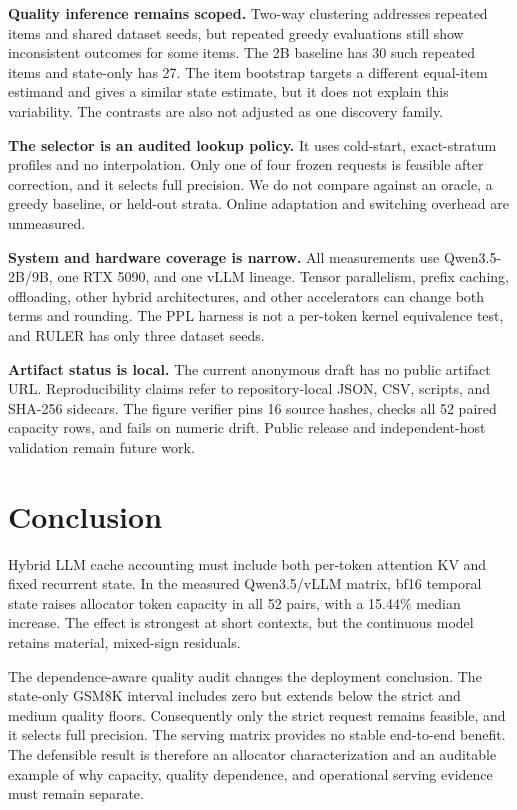 \documentclass{article}
\begin{document}
\textbf{Quality inference remains scoped.}
Two-way clustering addresses repeated items and shared dataset seeds, but
repeated greedy evaluations still show inconsistent outcomes for some items.
The 2B baseline has 30 such repeated items and state-only has 27. The item
bootstrap targets a different equal-item estimand and gives a similar state
estimate, but it does not explain this variability. The contrasts are also
not adjusted as one discovery family.

\textbf{The selector is an audited lookup policy.}
It uses cold-start, exact-stratum profiles and no interpolation. Only one of
four frozen requests is feasible after correction, and it selects full
precision. We do not compare against an oracle, a greedy baseline, or held-out
strata. Online adaptation and switching overhead are unmeasured.

\textbf{System and hardware coverage is narrow.}
All measurements use Qwen3.5-2B/9B, one RTX 5090, and one vLLM lineage. Tensor
parallelism, prefix caching, offloading, other hybrid architectures, and other
accelerators can change both terms and rounding. The PPL harness is not a
per-token kernel equivalence test, and RULER has only three dataset seeds.

\textbf{Artifact status is local.}
The current anonymous draft has no public artifact URL. Reproducibility claims
refer to repository-local JSON, CSV, scripts, and SHA-256 sidecars. The figure
verifier pins 16 source hashes, checks all 52 paired capacity rows, and fails
on numeric drift. Public release and independent-host validation remain future
work.

\section{Conclusion}
\label{sec:conclusion}

Hybrid LLM cache accounting must include both per-token attention KV and fixed
recurrent state. In the measured Qwen3.5/vLLM matrix, bf16 temporal state raises
allocator token capacity in all 52 pairs, with a 15.44\% median increase. The
effect is strongest at short contexts, but the continuous model retains
material, mixed-sign residuals.

The dependence-aware quality audit changes the deployment conclusion. The
state-only GSM8K interval includes zero but extends below the strict and medium
quality floors. Consequently only the strict request remains feasible, and it
selects full precision. The serving matrix provides no stable end-to-end
benefit. The defensible result is therefore an allocator characterization and
an auditable example of why capacity, quality dependence, and operational
serving evidence must remain separate.

\FloatBarrier


\end{document}
